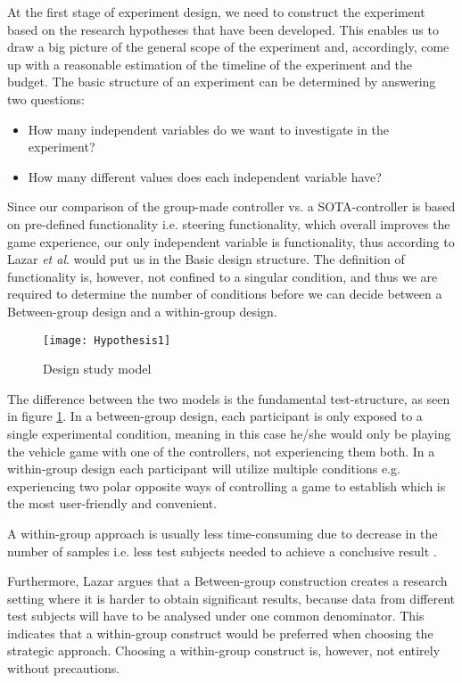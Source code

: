 At the first stage of experiment design, we need to construct the experiment based on the research hypotheses that have been developed. This enables us to draw a big picture of the general scope of the experiment and, accordingly, come up with a reasonable estimation of the timeline of the experiment and the budget. The basic structure of an experiment can be determined by answering two questions:

\begin{itemize}
	\item How many independent variables do we want to investigate in the experiment?
	\item How many different values does each independent variable have?
\end{itemize}
\parencite{Lazar2010}
\bigskip

Since our comparison of the group-made controller vs. a SOTA-controller is based on pre-defined functionality i.e. steering functionality, which overall improves the game experience, our only independent variable is functionality, thus according to Lazar \textit{et al}. would put us in the Basic design structure. The definition of functionality is, however, not confined to a singular condition, and thus we are required to determine the number of conditions before we can decide between a Between-group design and a within-group design.	

\begin{figure}[h]
\centering
\texttt{[image: Hypothesis1]}
\caption{Design study model}
\label{fig:designstudy}
\end{figure}

The difference between the two models is the fundamental test-structure, as seen in figure \ref{fig:designstudy}. In a between-group design, each participant is only exposed to a single experimental condition, meaning in this case he/she would only be playing the vehicle game with one of the controllers, not experiencing them both. In a within-group design each participant will utilize multiple conditions e.g. experiencing two polar opposite ways of controlling a game to establish which is the most user-friendly and convenient.

A within-group approach is usually less time-consuming due to decrease in the number of samples i.e. less test subjects needed to achieve a conclusive result \parencite{Lazar2010}.

Furthermore, Lazar argues that a Between-group construction creates a research setting where it is harder to obtain significant results, because data from different test subjects will have to be analysed under one common denominator. This indicates that a within-group construct would be preferred when choosing the strategic approach. Choosing a within-group construct is, however, not entirely without precautions.
\bigskip

